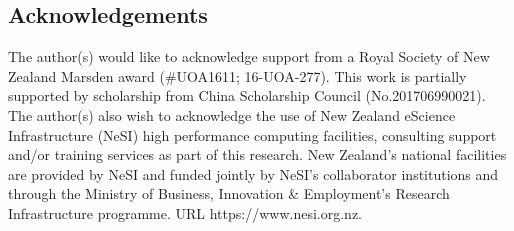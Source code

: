 \documentclass{bmcart}
\begin{document}
\begin{backmatter}
%
\section*{Acknowledgements}
The author(s) would like to acknowledge support from a Royal Society of New Zealand Marsden award (\#UOA1611; 16-UOA-277). This work is partially supported by scholarship from China Scholarship Council (No.201706990021). The author(s) also wish to acknowledge the use of New Zealand eScience Infrastructure (NeSI) high performance computing facilities, consulting support and/or training services as part of this research. New Zealand's national facilities are provided by NeSI and funded jointly by NeSI's collaborator institutions and through the Ministry of Business, Innovation \& Employment's Research Infrastructure programme. URL https://www.nesi.org.nz.



\end{backmatter}
\end{document}
